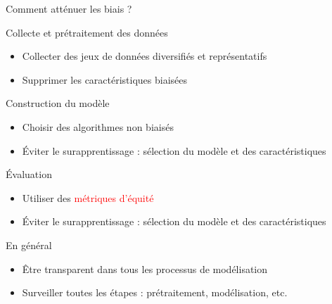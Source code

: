 \begin{frame}{Comment atténuer les biais ?}

    \begin{overprint}
        \begin{block}{Collecte et prétraitement des données}
            \medskip
            \begin{itemize}
                \item Collecter des jeux de données diversifiés et représentatifs
                \item Supprimer les caractéristiques biaisées
            \end{itemize}
        \end{block}

        \begin{block}{Construction du modèle}
            \medskip
            \begin{itemize}
                \item Choisir des algorithmes non biaisés
                \item Éviter le surapprentissage : sélection du modèle et des caractéristiques
            \end{itemize}
        \end{block}

        \begin{block}{Évaluation}
            \medskip
            \begin{itemize}
                \item Utiliser des \textcolor{red}{métriques d'équité}
                \item Éviter le surapprentissage : sélection du modèle et des caractéristiques
            \end{itemize}
        \end{block}

        \begin{block}{En général}
            \medskip
            \begin{itemize}
                \item Être transparent dans tous les processus de modélisation
                \item Surveiller toutes les étapes : prétraitement, modélisation, etc.
            \end{itemize}
        \end{block}


    \end{overprint}


\end{frame}
